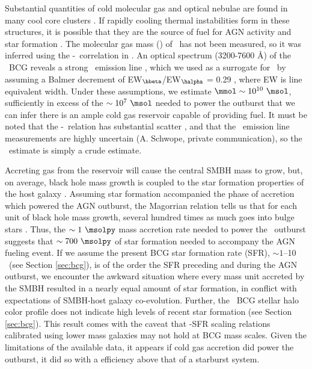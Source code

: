 \documentclass[11pt, preprint]{aastex}
\begin{document}
Substantial quantities of cold molecular gas and optical nebulae are
found in many cool core clusters \citep{crawford99, edge01}. If
rapidly cooling thermal instabilities form in these structures, it is
possible that they are the source of fuel for AGN activity and star
formation \citep[\eg][]{pizzolato05, 2006NewA...12...38S,
  2010MNRAS.408..961P}. The molecular gas mass (\mmol) of \rbs\ has
not been measured, so it was inferred using the
\mmol-\halpha\ correlation in \citet{edge01}. An optical spectrum
(3200-7600 \AA) of the \rbs\ BCG reveals a strong \hbeta\ emission
line \citep{rbs1, rbs2}, which we used as a surrogate for \halpha\ by
assuming a Balmer decrement of EW$_{\hbeta}$/EW$_{\halpha}$ = 0.29
\citep{2006ApJ...642..775M}, where EW is line equivalent width. Under
these assumptions, we estimate $\mmol \sim 10^{10} ~\msol$,
sufficiently in excess of the $\sim 10^7 ~\msol$ needed to power the
outburst that we can infer there is an ample cold gas reservoir
capable of providing fuel. It must be noted that the
\mmol-\halpha\ relation has substantial scatter \citep{salome03}, and
that the \rbs\ emission line measurements are highly uncertain
(A. Schwope, private communication), so the \mmol\ estimate is simply
a crude estimate.

Accreting gas from the reservoir will cause the central SMBH mass to
grow, but, on average, black hole mass growth is coupled to the star
formation properties of the host galaxy
\citep[\eg][]{1995ARA&A..33..581K, 2000ApJ...539L...9F}. Assuming star
formation accompanied the phase of accretion which powered the AGN
outburst, the Magorrian relation \citep{magorrian} tells us that for
each unit of black hole mass growth, several hundred times as much
goes into bulge stars \citep[\eg][]{2004ApJ...604L..89H}. Thus, the
$\sim 1 ~\msolpy$ mass accretion rate needed to power the
\rbs\ outburst suggests that $\sim 700 ~\msolpy$ of star formation
needed to accompany the AGN fueling event. If we assume the present
BCG star formation rate (SFR), $\sim 1$--10 \msolpy\ (see Section
\ref{sec:bcg}), is of the order the SFR preceding and during the AGN
outburst, we encounter the awkward situation where every mass unit
accreted by the SMBH resulted in a nearly equal amount of star
formation, in conflict with expectations of SMBH-host galaxy
co-evolution. Further, the \rbs\ BCG stellar halo color profile does
not indicate high levels of recent star formation (see Section
\ref{sec:bcg}). This result comes with the caveat that \mbh-SFR
scaling relations calibrated using lower mass galaxies may not hold at
BCG mass scales. Given the limitations of the available data, it
appears if cold gas accretion did power the outburst, it did so with a
efficiency above that of a starburst system.
\end{document}
